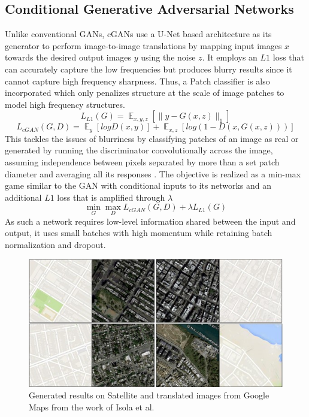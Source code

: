 \documentclass{Configuration_Files/PoliMi3i_thesis}
\begin{document}
\subsection{Conditional Generative Adversarial Networks}
Unlike conventional GANs, cGANs use a U-Net based architecture as its generator to 
perform image-to-image translations by mapping input images $x$ towards the 
desired output images $y$ using the noise $z$. It employs an $L1$ loss that can accurately 
capture the low frequencies but produces blurry results since it cannot capture high frequency 
sharpness. Thus, a Patch classifier is also incorporated which only penalizes structure at the scale 
of image patches to model high frequency structures. 
\begin{equation} \label{eq:l1loss}
L_{L1}(G) =  \mathop{{}\mathbb{E}}_{x,y,z}[\|y-G(x,z)\|_{1}]
\end{equation}
\begin{equation} \label{eq:patchloss}
L_{cGAN}(G,D) =  \mathop{{}\mathbb{E}}_{y}[logD(x,y)] +  \mathop{{}\mathbb{E}}_{x,z}[log(1-D(x,G(x,z)))]
\end{equation}
This tackles the issues of blurriness by classifying patches of an image as real or generated by running 
the discriminator convolutionally across the image, assuming independence between pixels separated 
by more than a set patch diameter and averaging all its responses \cite{PhI17}. The objective is
realized as a min-max game similar to the GAN with conditional inputs to its networks and an additional 
$L1$ loss that is amplified through $\lambda$
\begin{equation} \label{eq:cganminmax}
\min_{G}\max_{D}L_{cGAN}(G,D)+\lambda L_{L1}(G)
\end{equation}
As such a network 
requires low-level information shared between the input and output, it uses small 
batches with high momentum while retaining batch normalization and dropout. 
\begin{figure}[H]
    \centering
    \includegraphics[width=1\textwidth]{cgan_results.jpg}
    \caption[Generated Google Maps images from the work of Isola et al.]{Generated results on Satellite and translated images from Google Maps from the work of Isola et al.}
    \label{fig:cganresults}
\end{figure}
\end{document}
